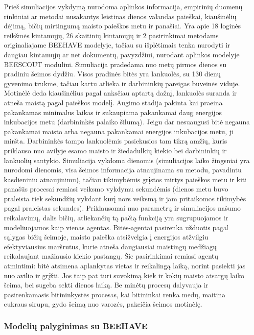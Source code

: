 \documentclass{VUMIFKompMagistrinis}
\begin{document}
Prieš simuliacijos vykdymą nurodoma aplinkos informacija, empirinių duomenų rinkiniai ar metodai nusakantys leistinas dienos valandas paieškai, kiaušinėlių dėjimą, bičių mirtingumą maisto paieškos metu ir panašiai. Yra apie 18 loginės reikšmės kintamųjų, 26 skaitinių kintamųjų ir 2 pasirinkimai metodams originaliajame BEEHAVE modelyje, tačiau su išplėtimais tenka nurodyti ir daugiau kintamųjų ar net dokumentų, pavyzdžiui, nurodant aplinkos modelyje BEESCOUT moduliui.
Simuliacija pradedama nuo metų pirmos dienos su pradiniu šeimos dydžiu. Visos pradinės bitės yra lankuolės, su 130 dienų gyvenimo trukme, tačiau kartu atlieka ir darbininkių pareigas buveinės viduje. Motinėlė deda kiaušinėlius pagal anksčiau aptartą dažnį, lankuolės suranda ir atneša maistą pagal paieškos modelį.  
Augimo stadija pakinta kai praeina pakankamas minimalus laikas ir sukaupiama pakankamai daug energijos inkubacijos metu (darbininkės palaiko šilumą). Jeigu dar nesuaugusi bitė negauna pakankamai maisto arba negauna pakankamai energijos inkubacijos metu, ji miršta.
Darbininkės tampa lankuolėmis pasiekusios tam tikrą amžių, kuris priklauso nuo avilyje esamo maisto ir žiedadulkių  kiekio bei darbininkių ir lankuolių santykio. 
Simuliacija vykdoma dienomis (simuliacijos laiko žingsniai yra nurodomi dienomis, visa šeimos informacija atnaujinama su metodu, pavadintu kasdieniniu atnaujinimu), tačiau tikimybėmis grįstos mirtys paieškos metu ir kiti panašūs procesai remiasi veiksmo vykdymu sekundėmis (dienos metu buvo praleista tiek sekundžių vykdant kurį nors veiksmą ir jam pritaikomos tikimybės pagal praleistas sekundes). 
Priklausomai nuo parametrų ir simuliacijos našumo reikalavimų, dalis bičių, atliekančių tą pačią funkciją yra sugrupuojamos ir modeliuojamos kaip vienas agentas. Bitės-agentai pasirenka užduotis pagal sąlygas bičių šeimoje, maisto paieška atsižvelgia į energijos atžvilgiu efektyviausius maršrutus, kurie atneša daugiausiai maistingų medžiagų reikalaujant mažiausio kiekio pastangų. Šie pasirinkimai remiasi agentų atmintimi: bitė atsimena aplankytas vietas ir reikalingą laiką, norint pasiekti jas nuo avilio ir grįžti. Jos taip pat turi suvokimą kiek ir kokių maisto atsargų laiko šeima, bei sugeba sekti dienos laiką.
Be minėtų procesų dalyvauja ir pasirenkamasis bitininkystės procesas, kai bitininkai renka medų, maitina cukraus sirupu, gydo šeimą nuo varozės, pakeičia šeimos motinėlę. 



\subsubsection{Modelių palyginimas su BEEHAVE}
\end{document}
